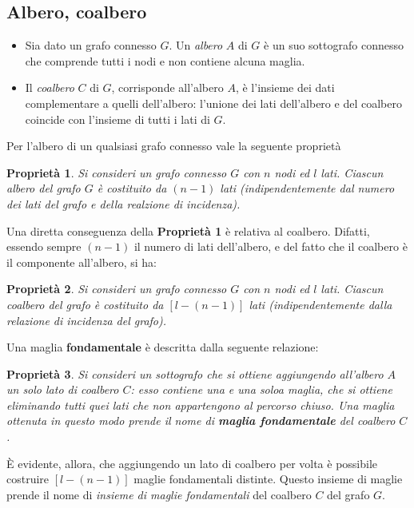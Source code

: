 \documentclass[a4paper]{report}
\newtheorem{prop}{Propriet\`a}
\begin{document}
\subsection{Albero, coalbero}

\begin{itemize}
\item Sia dato un grafo connesso $G$. Un \emph{albero} $A$ di $G$ \`e
  un suo sottografo connesso che comprende tutti i nodi e non
  contiene alcuna maglia.
\item Il \emph{coalbero} $C$ di $G$, corrisponde all'albero $A$, \`e
  l'insieme dei dati complementare a quelli dell'albero: l'unione dei
  lati dell'albero e del coalbero coincide con l'insieme di tutti i
  lati di $G$.
\end{itemize}

Per l'albero di un qualsiasi grafo connesso vale la seguente
propriet\`a

\begin{prop}
  Si consideri un grafo connesso $G$ con $n$ nodi ed $l$ lati. Ciascun
  albero del grafo $G$ \`e costituito da $(n-1)$ lati
  (indipendentemente dal numero dei lati del grafo e della realzione
  di incidenza).
\end{prop}

Una diretta conseguenza della {\bf Propriet\`a 1} \`e relativa al
coalbero. Difatti, essendo sempre $(n-1)$ il numero di lati
dell'albero, e del fatto che il coalbero \`e il componente all'albero,
si ha:

\begin{prop}
  Si consideri un grafo connesso $G$ con $n$ nodi ed $l$ lati. Ciascun
  coalbero del grafo \`e costituito da $[l-(n-1)]$ lati
  (indipendentemente dalla relazione di incidenza del grafo).
\end{prop}

Una maglia {\bf fondamentale} \`e descritta dalla seguente relazione:

\begin{prop}
  Si consideri un sottografo che si ottiene aggiungendo all'albero $A$
  un solo lato di coalbero $C$: esso contiene una e una soloa maglia,
  che si ottiene eliminando tutti quei lati che non appartengono al
  percorso chiuso. Una maglia ottenuta in questo modo prende il nome
  di {\bf maglia fondamentale} del coalbero $C$.
\end{prop}

\`E evidente, allora, che aggiungendo un lato di coalbero per volta
\`e possibile costruire $[l-(n-1)]$ maglie fondamentali
distinte. Questo insieme di maglie prende il nome di \emph{insieme di
  maglie fondamentali} del coalbero $C$ del grafo $G$.
\end{document}
